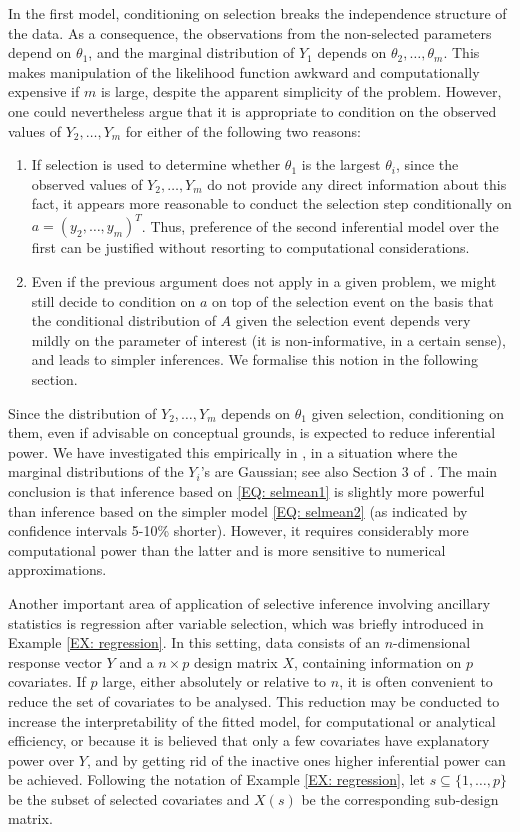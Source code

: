 \documentclass[pdflatex,sn-chicago]{sn-jnl}%
\theoremstyle{thmstyleone}%
\theoremstyle{thmstyletwo}%
\theoremstyle{thmstylethree}%
\begin{document}
In the first model, conditioning on selection breaks the independence structure of the data. As a consequence, the observations from the non-selected parameters depend on $\theta_1$, and the marginal distribution of $Y_1$ depends on $\theta_2, \ldots, \theta_m$. This makes manipulation of the likelihood function awkward and computationally expensive if $m$ is large, despite the apparent simplicity of the problem. However, one could nevertheless argue that it is appropriate to condition on the observed values of $Y_2, \ldots, Y_m$ for either of the following two reasons:
\begin{enumerate}
    \item If selection is used to determine whether $\theta_1$ is the largest $\theta_i$, since the observed values of $Y_2, \ldots, Y_m$ do not provide any direct information about this fact, it appears more reasonable to conduct the selection step conditionally on $a = (y_2, \ldots, y_m)^T$. Thus, preference of the second inferential model over the first can be justified without resorting to computational considerations.
    \item Even if the previous argument does not apply in a given problem, we might still decide to condition on $a$ on top of the selection event on the basis that the conditional distribution of $A$ given the selection event depends very mildly on the parameter of interest (it is non-informative, in a certain sense), and leads to simpler inferences. We formalise this notion in the following section. 
\end{enumerate}

Since the distribution of $Y_2, \ldots, Y_m$ depends on $\theta_1$ given selection, conditioning on them, even if advisable on conceptual grounds, is expected to reduce inferential power. We have investigated this empirically in \cite{handbook}, in a situation where the marginal distributions of the $Y_i$'s are Gaussian; see also Section 3 of \cite{handbook_open}. The main conclusion is that inference based on \eqref{EQ: selmean1} is slightly more powerful than inference based on the simpler model \eqref{EQ: selmean2} (as indicated by confidence intervals 5-10\% shorter). However, it requires considerably more computational power than the latter and is more sensitive to numerical approximations.

Another important area of application of selective inference involving ancillary statistics is regression after variable selection, which was briefly introduced in Example \ref{EX: regression}. In this setting, data consists of an $n$-dimensional response vector $Y$ and a $n\times p$ design matrix $X$, containing information on $p$ covariates. If $p$ large, either absolutely or relative to $n$, it is often convenient to reduce the set of covariates to be analysed. This reduction may be conducted to increase the interpretability of the fitted model, for computational or analytical efficiency, or because it is believed that only a few covariates have explanatory power over $Y$, and by getting rid of the inactive ones higher inferential power can be achieved. Following the notation of Example \ref{EX: regression}, let $s\subseteq \{1, \ldots, p\}$ be the subset of selected covariates and $X(s)$ be the corresponding sub-design matrix.
\end{document}
